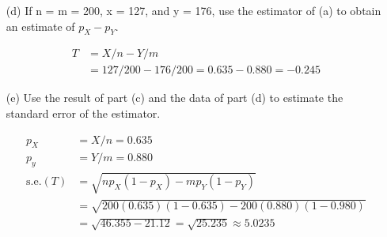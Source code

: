 \begin{itemize}
\begin{itemize}
            \item [(d)]
            If n = m = 200, x = 127, and y = 176, use the estimator of (a) to obtain an estimate of $p_{X} - p_{Y}$.
            \begin{mdframed}
                \begin{align*}
                    T   & = X/n - Y/m   \\
                        & = 127/200 - 176/200 = 0.635 - 0.880 = \boxed{-0.245}
                \end{align*}
            \end{mdframed}

            \item [(e)]
            Use the result of part (c) and the data of part (d) to estimate the standard error of the estimator.
            \begin{mdframed}
                \begin{align*}
                    p_{X}           & = X/n = 0.635                                         \\
                    p_{y}           & = Y/m = 0.880                                         \\
                    \text{s.e.}(T)  & = \sqrt{np_{X}(1-p_{X}) - mp_{Y}(1-p_{Y})}            \\
                                    & = \sqrt{200(0.635)(1-0.635) - 200(0.880)(1-0.980)}    \\
                                    & = \sqrt{46.355 - 21.12} = \sqrt{25.235} \approx \boxed{5.0235}
                \end{align*}
            \end{mdframed}

        \end{itemize}
    \end{itemize}

